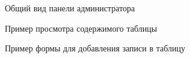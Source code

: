 \documentclass[a4paper]{article}
\begin{document}
				\begin{figure}[H]
					\centering
					\caption{Общий вид панели администратора}
				\end{figure}
				
				\begin{figure}[H]
					\centering
					\caption{Пример просмотра содержимого таблицы}
				\end{figure}
				
				\begin{figure}[H]
					\centering
					\caption{Пример формы для добавления записи в таблицу}
				\end{figure}
				
\end{document}
